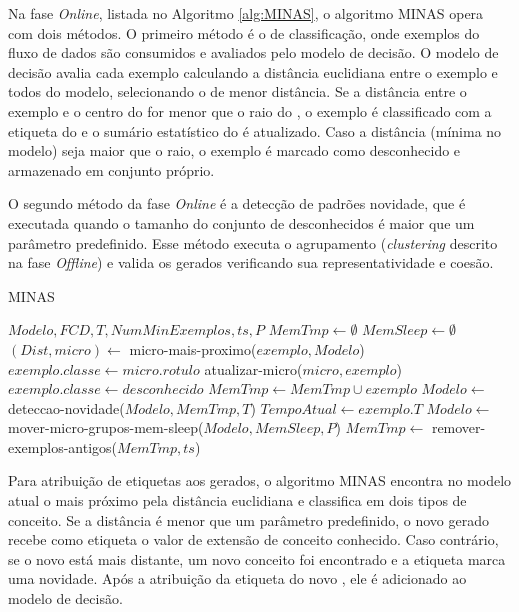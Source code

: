 Na fase \emph{Online}, listada no Algoritmo \ref{alg:MINAS}, o algoritmo MINAS
opera com dois métodos.
O primeiro método é o de classificação, onde exemplos do fluxo de dados
são consumidos e avaliados pelo modelo de decisão.
O modelo de decisão avalia cada exemplo calculando a distância euclidiana
entre o exemplo e todos \mclusters do modelo, selecionando o
\mcluster de menor distância.
Se a distância entre o exemplo e o centro do \mcluster for menor que
o raio do \mcluster, o exemplo é classificado com a etiqueta do \mcluster
e o sumário estatístico do \mcluster é atualizado.
Caso a distância (mínima no modelo) seja maior que o raio,
o exemplo é marcado como desconhecido e armazenado
em conjunto próprio.

O segundo método da fase \emph{Online} é a detecção de padrões novidade,
que é executada quando o tamanho do conjunto de desconhecidos é maior
que um parâmetro predefinido.
Esse método executa o agrupamento (\emph{clustering} descrito na fase
\emph{Offline}) e valida os \mclusters gerados verificando sua representatividade
e coesão.

\begin{algorithm}[ht]
  \caption{MINAS \cite{Faria2016minas,Cassales2019a}}
  \label{alg:MINAS}
  \renewcommand{\algorithmicrequire}{\textbf{Entrada:}}
  \begin{algorithmic}[1]
    \REQUIRE $Modelo,FCD,T,NumMinExemplos,ts,P$
    \STATE $MemTmp \leftarrow \emptyset$
    \STATE $MemSleep \leftarrow \emptyset$
    \STATE $(Dist,micro) \leftarrow$ micro-mais-proximo($exemplo,Modelo$)
    \STATE $exemplo.classe \leftarrow micro.rotulo$
    \STATE atualizar-micro($micro,exemplo$)
    \ELSE
    \STATE $exemplo.classe \leftarrow desconhecido$
    \STATE $MemTmp \leftarrow MemTmp \cup exemplo$
    \STATE $Modelo \leftarrow $ deteccao-novidade($Modelo,MemTmp,T$)
    \ENDIF
    \ENDIF
    \STATE $TempoAtual \leftarrow exemplo.T$
    \STATE $Modelo \leftarrow$ mover-micro-grupos-mem-sleep($Modelo,MemSleep,P$)
    \STATE $MemTmp \leftarrow$ remover-exemplos-antigos($MemTmp,ts$)
    \ENDIF
    \ENDFOR
  \end{algorithmic}
\end{algorithm}

Para atribuição de etiquetas aos \mclusters gerados, o algoritmo MINAS
encontra no modelo atual o \mcluster mais próximo pela distância
euclidiana e classifica em dois tipos de conceito.
Se a distância é menor que um parâmetro predefinido,
o novo \mcluster gerado recebe como etiqueta o valor de extensão
de conceito conhecido.
Caso contrário, se o novo \mcluster está mais distante,
um novo conceito foi encontrado e a etiqueta marca uma novidade.
Após a atribuição da etiqueta do novo \mcluster, ele é adicionado
ao modelo de decisão.

